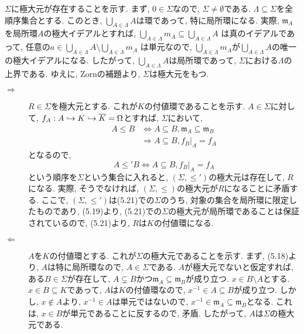 \documentclass[dvipdfmx]{jsarticle}
\begin{document}
    \begin{problem}
        $\Sigma$に極大元が存在することを示す.
        まず, $0 \in \Sigma$なので, $\Sigma \neq \emptyset$である.
        $\Lambda \subseteq \Sigma$を全順序集合とする.
        このとき, $\bigcup_{A \in \Lambda} A$は環であって,
        特に局所環になる.
        実際,
        $\mathfrak{m}_A$を局所環$A$の極大イデアルとすれば,
        $\bigcup_{A \in \Lambda} m_A \subseteq \bigcup_{A \in \Lambda} A$
        は真のイデアルであって,
        任意の$a \in\bigcup_{A \in \Lambda} A \setminus \bigcup_{A \in \Lambda} m_A$
        は単元なので, $\bigcup_{A \in \Lambda} m_A$が$\bigcup_{A \in \Lambda} A$の唯一の極大イデアルになる.
        したがって,
        $\bigcup_{A \in \Lambda} A$は局所環であって, $\Sigma$における$\Lambda$の上界である.
        ゆえに, Zornの補題より, $\Sigma$は極大元をもつ.
        \begin{description}
            \item[$\Longrightarrow$] $R \in \Sigma$を極大元とする.
            これが$K$の付値環であることを示す.
            $A \in \Sigma$に対して,
            $f_A: A \hookrightarrow K \hookrightarrow \overline{K} = \Omega$とすれば,
            $\Sigma$において,
            \begin{align*}
                A \leq B &\Longleftrightarrow A \subseteq B, \mathfrak{m}_A \subseteq \mathfrak{m}_B\\
                &\Longrightarrow A \subseteq B, f_B|_A = f_A
            \end{align*}
            となるので,
            \[
                A \leq' B \Longleftrightarrow A \subseteq B, f_B|_A = f_A
            \]
            という順序を$\Sigma$という集合に入れると,
            $(\Sigma, \leq')$の極大元は存在して, $R$になる.
            実際, そうでなければ, $(\Sigma, \leq)$の極大元が$R$になることに矛盾する.
            ここで, $(\Sigma, \leq')$は(5.21)での$\Sigma$のうち, 対象の集合を局所環に限定したものであり,
            (5.19)より, (5.21)での$\Sigma$の極大元が局所環であることは保証されているので,
            (5.21)より, $R$は$K$の付値環になる.
            \item[$\Longleftarrow$] $A$を$K$の付値環とする.
            これが$\Sigma$の極大元であることを示す.
            まず, (5.18)より, $A$は特に局所環なので, $A \in \Sigma$である.
            $A$が極大元でないと仮定すれば, ある$B \in \Sigma$が存在して,
            $A \subsetneq B$かつ$\mathfrak{m}_A \subseteq \mathfrak{m}_B$が成り立つ.
            $x \in B \setminus A$とする.
            $x \in B \subseteq K$であって, $A$は$K$の付値環なので,
            $x^{-1} \in A \subseteq B$が成り立つ.
            しかし, $x \notin A$より, $x^{-1} \in A$は単元ではないので,
            $x^{-1} \in \mathfrak{m}_A \subseteq \mathfrak{m}_B$となる.
            これは, $x \in B$が単元であることに反するので, 矛盾.
            したがって, $A$は$\Sigma$の極大元である.
        \end{description}
    \end{problem}
\end{document}
